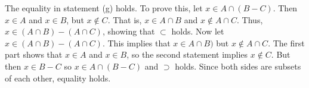 \documentclass[../../master.tex]{subfiles}
\begin{document}
\begin{solution}
    The equality in statement (g) holds.
    To prove this, let $x \in A \cap (B - C)$.
    Then $x \in A$ and $x \in B$, but $x \notin C$.
    That is, $x \in A \cap B$ and $x \notin A \cap C$.
    Thus, $x \in (A \cap B) - (A \cap C)$, showing that $\subset$ holds.
    Now let $x \in (A \cap B) - (A \cap C)$.
    This implies that $x \in A \cap B)$ but $x \notin A \cap C$.
    The first part shows that $x \in A$ and $x \in B$, so the second statement implies $x \notin C$.
    But then $x \in B - C$ so $x \in A \cap (B - C)$ and $\supset$ holds.
    Since both sides are subsets of each other, equality holds.
\end{solution}
\end{document}
